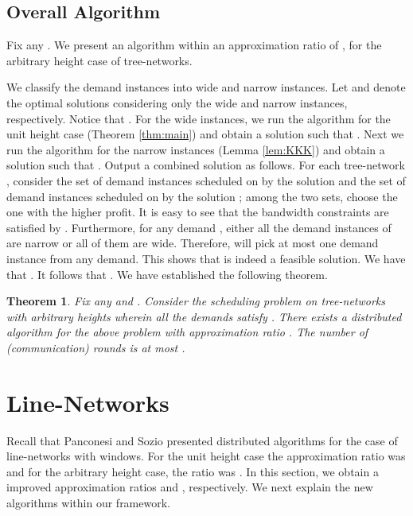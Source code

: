 \documentclass[11pt]{article}
\newtheorem{theorem}{\bf Theorem}[section]
\begin{document}
\subsection*{Overall Algorithm}
Fix any . We present an algorithm within an approximation ratio of ,
for the arbitrary height case of tree-networks.

We classify the demand instances into wide and narrow instances.
Let  and  denote the optimal solutions considering only the wide and narrow instances,
respectively. Notice that .
For the wide instances, we run the algorithm for the unit height case (Theorem \ref{thm:main})
and obtain a solution  such that .
Next we run the algorithm for the narrow instances (Lemma \ref{lem:KKK})
and obtain a solution  such that .
Output a combined solution  as follows.
For each tree-network , consider the set of demand instances scheduled on  by the solution 
and the set of demand instances scheduled on  by the solution ; among the two sets, choose the one
with the higher profit. It is easy to see that the bandwidth constraints are satisfied by .
Furthermore, for any demand , either all the demand instances of  are narrow
or all of them are wide. Therefore,  will pick at most one demand instance from any demand.
This shows that  is indeed a feasible solution.
We have that . It follows that .
We have established the following theorem.

\begin{theorem}
\label{thm:LLL}
Fix any  and . Consider the scheduling problem on tree-networks
with arbitrary heights wherein all the demands  satisfy .
There exists a distributed algorithm for the above problem with approximation ratio .
The number of (communication) rounds is at most 
.
\end{theorem}

\section{Line-Networks}
Recall that Panconesi and Sozio \cite{Pancj} presented distributed algorithms
for the case of line-networks with windows. For the unit height case the approximation ratio was 
and for the arbitrary height case, the ratio was . 
In this section, we obtain a improved approximation ratios  and , respectively.
We next explain the new algorithms within our framework.
\end{document}
